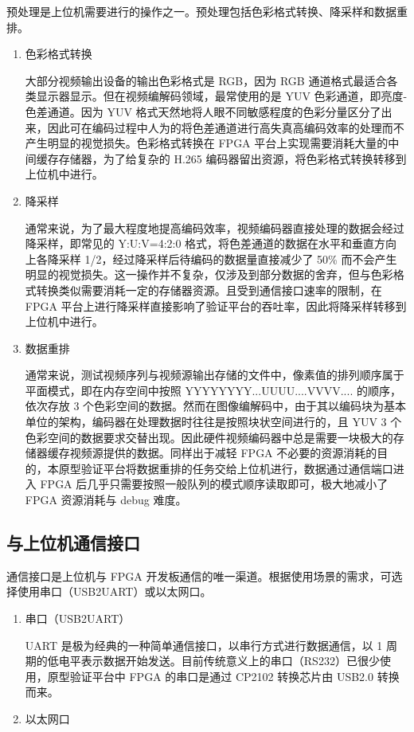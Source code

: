 预处理是上位机需要进行的操作之一。预处理包括色彩格式转换、降采样和数据重排。
\begin{enumerate}
    \item 色彩格式转换

          大部分视频输出设备的输出色彩格式是 RGB，因为 RGB 通道格式最适合各类显示器显示。但在视频编解码领域，最常使用的是 YUV 色彩通道，即亮度-色差通道。因为 YUV 格式天然地将人眼不同敏感程度的色彩分量区分了出来，因此可在编码过程中人为的将色差通道进行高失真高编码效率的处理而不产生明显的视觉损失。色彩格式转换在 FPGA 平台上实现需要消耗大量的中间缓存存储器，为了给复杂的 H.265 编码器留出资源，将色彩格式转换转移到上位机中进行。

    \item 降采样

          通常来说，为了最大程度地提高编码效率，视频编码器直接处理的数据会经过降采样，即常见的 Y:U:V=4:2:0 格式，将色差通道的数据在水平和垂直方向上各降采样 1/2，经过降采样后待编码的数据量直接减少了 50\% 而不会产生明显的视觉损失。这一操作并不复杂，仅涉及到部分数据的舍弃，但与色彩格式转换类似需要消耗一定的存储器资源。且受到通信接口速率的限制，在 FPGA 平台上进行降采样直接影响了验证平台的吞吐率，因此将降采样转移到上位机中进行。

    \item 数据重排

          通常来说，测试视频序列与视频源输出存储的文件中，像素值的排列顺序属于平面模式，即在内存空间中按照 YYYYYYYY...UUUU....VVVV.... 的顺序，依次存放 3 个色彩空间的数据。然而在图像编解码中，由于其以编码块为基本单位的架构，编码器在处理数据时往往是按照块状空间进行的，且 YUV 3 个色彩空间的数据要求交替出现。因此硬件视频编码器中总是需要一块极大的存储器缓存视频源提供的数据。同样出于减轻 FPGA 不必要的资源消耗的目的，本原型验证平台将数据重排的任务交给上位机进行，数据通过通信端口进入 FPGA 后几乎只需要按照一般队列的模式顺序读取即可，极大地减小了 FPGA 资源消耗与 debug 难度。
\end{enumerate}

\subsection{与上位机通信接口}
通信接口是上位机与 FPGA 开发板通信的唯一渠道。根据使用场景的需求，可选择使用串口（USB2UART）或以太网口。
\begin{enumerate}
    \item 串口（USB2UART）

        UART 是极为经典的一种简单通信接口，以串行方式进行数据通信，以 1 周期的低电平表示数据开始发送。目前传统意义上的串口（RS232）已很少使用，原型验证平台中 FPGA 的串口是通过 CP2102 转换芯片由 USB2.0 转换而来。

    \item 以太网口
\end{enumerate}


